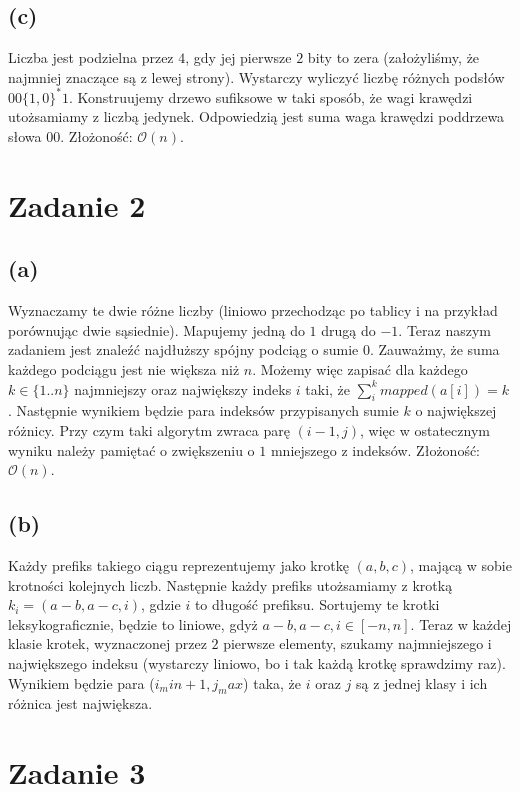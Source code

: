 \documentclass[12pt, a4paper]{article}
\newcommand{\MCALO}{\mathcal{O}}
\begin{document}
\subsection*{(c)}
Liczba jest podzielna przez $4$, gdy jej pierwsze $2$ bity to zera
(założyliśmy, że najmniej znaczące są z lewej strony). Wystarczy wyliczyć
liczbę różnych podsłów $00\{1,0\}^*1$. Konstruujemy drzewo sufiksowe w taki
sposób, że wagi krawędzi utożsamiamy z liczbą jedynek. Odpowiedzią jest suma
waga krawędzi poddrzewa słowa $00$.
Złożoność: $\MCALO(n)$.

\section*{Zadanie 2}
\subsection*{(a)}
Wyznaczamy te dwie różne liczby (liniowo przechodząc po tablicy i na przykład porównując dwie sąsiednie).
Mapujemy jedną do $1$ drugą do $-1$. Teraz naszym zadaniem jest znaleźć najdłuższy spójny podciąg
o sumie $0$. Zauważmy, że suma każdego podciągu jest nie większa niż $n$. Możemy więc zapisać
dla każdego $k \in \{1..n\}$ najmniejszy oraz największy indeks $i$ taki, że $\sum_{i}^k mapped(a[i]) = k$.
Następnie wynikiem będzie para indeksów przypisanych sumie $k$ o największej różnicy.
Przy czym taki algorytm zwraca parę $(i-1, j)$, więc w ostatecznym wyniku należy pamiętać o zwiększeniu
o $1$ mniejszego z indeksów.
Złożoność: $\MCALO(n)$.

\subsection*{(b)}
Każdy prefiks takiego ciągu reprezentujemy jako krotkę $(a, b, c)$, mającą
w sobie krotności kolejnych liczb. Następnie każdy prefiks utożsamiamy z krotką
$k_i = (a-b, a-c, i)$, gdzie $i$ to długość prefiksu. Sortujemy te krotki
leksykograficznie, będzie to liniowe, gdyż $a-b, a-c, i \in [-n, n]$. Teraz
w każdej klasie krotek, wyznaczonej przez $2$ pierwsze elementy, szukamy
najmniejszego i największego indeksu (wystarczy liniowo, bo i tak każdą krotkę
sprawdzimy raz). Wynikiem będzie para ($i_min + 1, j_max$) taka, że $i$ oraz
$j$ są z jednej klasy i ich różnica jest największa.

\section*{Zadanie 3}
\end{document}
